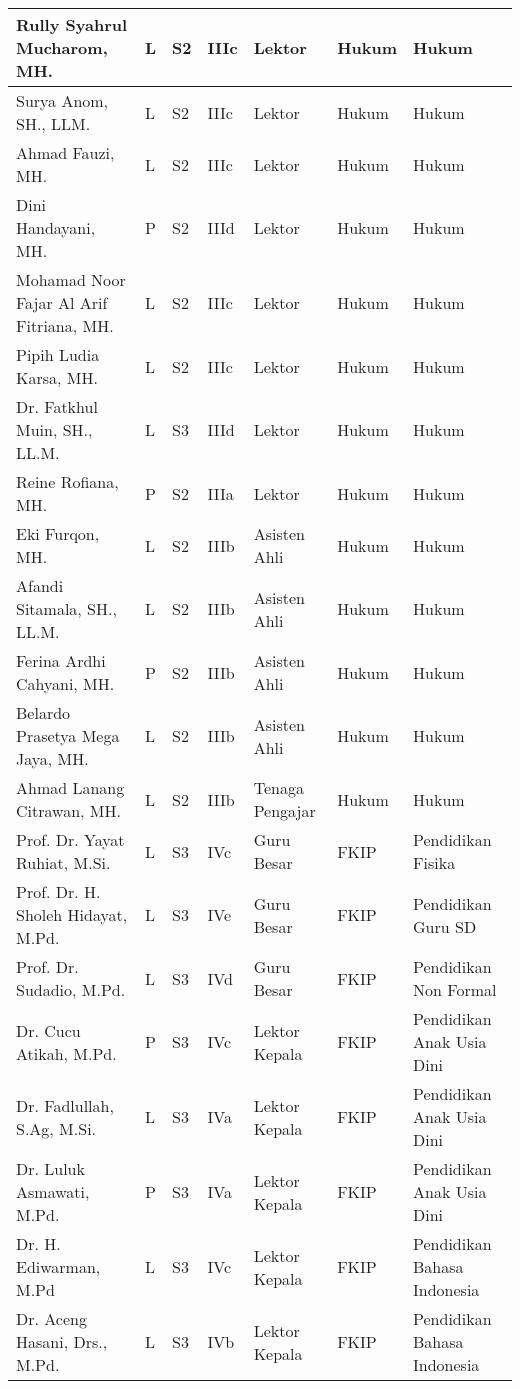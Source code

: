 \documentclass[
]{book}
\begin{document}
\begin{longtable}{l|l|l|l|l|l|l}
\hline
Rully Syahrul Mucharom, MH. & L & S2 & IIIc & Lektor & Hukum & Hukum\\
\hline
Surya Anom, SH., LLM. & L & S2 & IIIc & Lektor & Hukum & Hukum\\
\hline
Ahmad Fauzi, MH. & L & S2 & IIIc & Lektor & Hukum & Hukum\\
\hline
Dini Handayani, MH. & P & S2 & IIId & Lektor & Hukum & Hukum\\
\hline
Mohamad Noor Fajar Al Arif Fitriana, MH. & L & S2 & IIIc & Lektor & Hukum & Hukum\\
\hline
Pipih Ludia Karsa, MH. & L & S2 & IIIc & Lektor & Hukum & Hukum\\
\hline
Dr. Fatkhul Muin, SH., LL.M. & L & S3 & IIId & Lektor & Hukum & Hukum\\
\hline
Reine Rofiana, MH. & P & S2 & IIIa & Lektor & Hukum & Hukum\\
\hline
Eki Furqon, MH. & L & S2 & IIIb & Asisten Ahli & Hukum & Hukum\\
\hline
Afandi Sitamala, SH., LL.M. & L & S2 & IIIb & Asisten Ahli & Hukum & Hukum\\
\hline
Ferina Ardhi Cahyani, MH. & P & S2 & IIIb & Asisten Ahli & Hukum & Hukum\\
\hline
Belardo Prasetya Mega Jaya, MH. & L & S2 & IIIb & Asisten Ahli & Hukum & Hukum\\
\hline
Ahmad Lanang Citrawan, MH. & L & S2 & IIIb & Tenaga Pengajar & Hukum & Hukum\\
\hline
Prof. Dr. Yayat Ruhiat, M.Si. & L & S3 & IVc & Guru Besar & FKIP & Pendidikan Fisika\\
\hline
Prof. Dr. H. Sholeh Hidayat, M.Pd. & L & S3 & IVe & Guru Besar & FKIP & Pendidikan Guru SD\\
\hline
Prof. Dr. Sudadio, M.Pd. & L & S3 & IVd & Guru Besar & FKIP & Pendidikan Non Formal\\
\hline
Dr. Cucu Atikah, M.Pd. & P & S3 & IVc & Lektor Kepala & FKIP & Pendidikan Anak Usia Dini\\
\hline
Dr. Fadlullah, S.Ag, M.Si. & L & S3 & IVa & Lektor Kepala & FKIP & Pendidikan Anak Usia Dini\\
\hline
Dr. Luluk Asmawati, M.Pd. & P & S3 & IVa & Lektor Kepala & FKIP & Pendidikan Anak Usia Dini\\
\hline
Dr. H. Ediwarman, M.Pd & L & S3 & IVc & Lektor Kepala & FKIP & Pendidikan Bahasa Indonesia\\
\hline
Dr. Aceng Hasani, Drs., M.Pd. & L & S3 & IVb & Lektor Kepala & FKIP & Pendidikan Bahasa Indonesia\\

\end{longtable}
\end{document}
